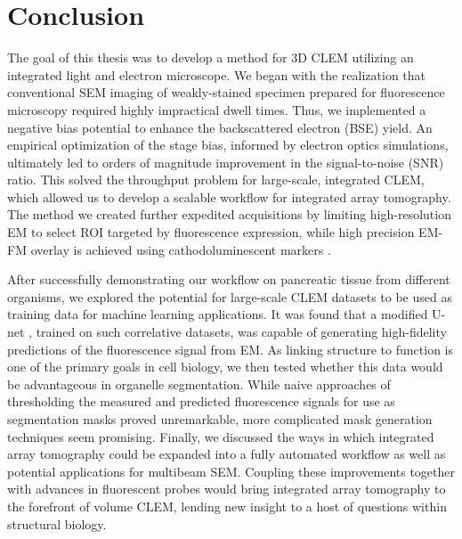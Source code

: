 \section{Conclusion}
\label{sec:5.3_conclusion}

The goal of this thesis was to develop a method for 3D CLEM utilizing an integrated light and electron microscope. We began with the realization that conventional SEM imaging of weakly-stained specimen prepared for fluorescence microscopy required highly impractical dwell times. Thus, we implemented a negative bias potential to enhance the backscattered electron (BSE) yield. An empirical optimization of the stage bias, informed by electron optics simulations, ultimately led to orders of magnitude improvement in the signal-to-noise (SNR) ratio. This solved the throughput problem for large-scale, integrated CLEM, which allowed us to develop a scalable workflow for integrated array tomography. The method we created further expedited acquisitions by limiting high-resolution EM to select ROI targeted by fluorescence expression, while high precision EM-FM overlay is achieved using cathodoluminescent markers \cite{haring2017automated}. 

After successfully demonstrating our workflow on pancreatic tissue from different organisms, we explored the potential for large-scale CLEM datasets to be used as training data for machine learning applications. It was found that a modified U-net \cite{ronneberger2015u}, trained on such correlative datasets, was capable of generating high-fidelity predictions of the fluorescence signal from EM. As linking structure to function is one of the primary goals in cell biology, we then tested whether this data would be advantageous in organelle segmentation. While naive approaches of thresholding the measured and predicted fluorescence signals for use as segmentation masks proved unremarkable, more complicated mask generation techniques seem promising. Finally, we discussed the ways in which integrated array tomography could be expanded into a fully automated workflow as well as potential applications for multibeam SEM. Coupling these improvements together with advances in fluorescent probes would bring integrated array tomography to the forefront of volume CLEM, lending new insight to a host of questions within structural biology.
